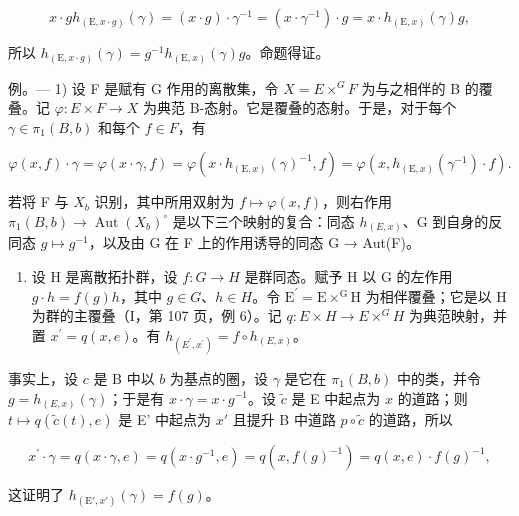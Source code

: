 \[
x \cdot g h _ {(\mathrm{E}, x \cdot g)} (\gamma) = (x \cdot g) \cdot \gamma^ {- 1} = (x \cdot \gamma^ {- 1}) \cdot g = x \cdot h _ {(\mathrm{E}, x)} (\gamma) g,
\]

所以 \(h_{(\mathrm{E},x\cdot g)}(\gamma)=g^{-1}h_{(\mathrm{E},x)}(\gamma)g\)。命题得证。

例。--- 1) 设 F 是赋有 G 作用的离散集，令 \(X = E \times^{G} F\) 为与之相伴的 B 的覆叠。记 \(\varphi: E \times F \to X\) 为典范 B-态射。它是覆叠的态射。于是，对于每个 \(\gamma \in \pi_{1}(B, b)\) 和每个 \(f \in F\)，有

\[
\varphi (x, f) \cdot \gamma = \varphi (x \cdot \gamma , f) = \varphi (x \cdot h _ {(\mathrm{E}, x)} (\gamma) ^ {- 1}, f) = \varphi (x, h _ {(\mathrm{E}, x)} (\gamma^ {- 1}) \cdot f).\tag{5}
\]

若将 F 与 \(X_{b}\) 识别，其中所用双射为 \(f \mapsto \varphi(x, f)\)，则右作用 \(\pi_{1}(B, b) \to \operatorname{Aut}(X_{b})^{\circ}\) 是以下三个映射的复合：同态 \(h_{(E,x)}\)、G 到自身的反同态 \(g \mapsto g^{-1}\)，以及由 G 在 F 上的作用诱导的同态 G → Aut(F)。

\begin{enumerate}
\def\labelenumi{\arabic{enumi})}
\setcounter{enumi}{1}
\tightlist
\item
  设 H 是离散拓扑群，设 \(f\colon G\to H\) 是群同态。赋予 H 以 G 的左作用 \(g\cdot h=f(g)h\)，其中 \(g\in G\)、\(h\in H\)。令 \(\mathrm{E}^{\prime}=\mathrm{E}\times^{\mathrm{G}}\mathrm{H}\) 为相伴覆叠；它是以 H 为群的主覆叠（I，第 107 页，例 6）。记 \(q\colon E\times H\to E\times^{G}H\) 为典范映射，并置 \(x^{\prime}=q(x,e)\)。有 \(h_{(E^{\prime},x^{\prime})}=f\circ h_{(E,x)}\)。
\end{enumerate}

事实上，设 \(c\) 是 B 中以 \(b\) 为基点的圈，设 \(\gamma\) 是它在 \(\pi_1(B,b)\) 中的类，并令 \(g = h_{(E,x)}(\gamma)\)；于是有 \(x \cdot \gamma = x \cdot g^{-1}\)。设 \(\widetilde{c}\) 是 E 中起点为 \(x\) 的道路；则 \(t \mapsto q(\widetilde{c}(t), e)\) 是 E' 中起点为 \(x'\) 且提升 B 中道路 \(p \circ \widetilde{c}\) 的道路，所以

\[
x ^ {\prime} \cdot \gamma = q (x \cdot \gamma , e) = q (x \cdot g ^ {- 1}, e) = q (x, f (g) ^ {- 1}) = q (x, e) \cdot f (g) ^ {- 1},
\]

这证明了 \(h_{(\mathrm{E}', x')}(\gamma) = f(g)\)。

